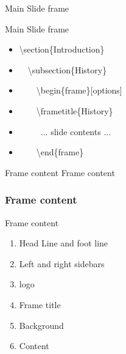 \documentclass[10pt,blue,xcolor=pdftex,dvipsnames,table,handout]{beamer}
\begin{document}

		\begin{frame}{Main Slide frame}

			\begin{block}{Main Slide frame}
			\begin{itemize}
			\item[] \textbackslash section\{Introduction\} 
			\item[] ~~\textbackslash subsection\{History\} 
			\item[] ~~~~\textbackslash begin\{frame\}[options] 
			\item[] ~~~~\textbackslash frametitle\{History\} 
			\item[] ~~~~~... slide contents ... 
			\item[] ~~~~\textbackslash end\{frame\} 
			\end{itemize}
			\end{block}



		\end{frame}


		\begin{frame}[plain]{Frame content}
			Frame content
		\end{frame}

		\begin{frame}
		\frametitle{Frame content}

			\begin{block} {Frame content}
			\begin{enumerate}
			\item Head Line and foot line
			\item Left and right sidebars
			\item logo
			\item Frame title
			\item Background
			\item Content
			\end{enumerate}
			\end{block}

		\end{frame}
\end{document}

